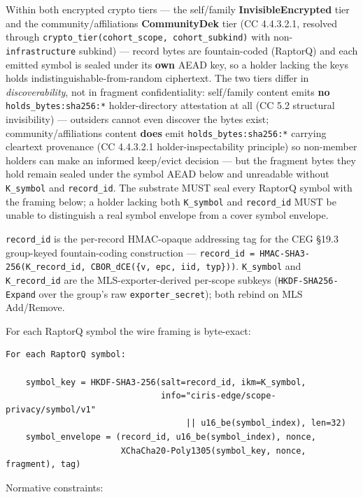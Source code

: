 \documentclass[11pt]{article}
\begin{document}
Within both encrypted crypto tiers — the self/family \textbf{InvisibleEncrypted} tier and the community/affiliations \textbf{CommunityDek} tier (CC 4.4.3.2.1, resolved through \texttt{crypto\_tier(cohort\_scope, cohort\_subkind)} with non-\texttt{infrastructure} subkind) — record bytes are fountain-coded (RaptorQ) and each emitted symbol is sealed under its \textbf{own} AEAD key, so a holder lacking the keys holds indistinguishable-from-random ciphertext. The two tiers differ in \textit{discoverability}, not in fragment confidentiality: self/family content emits \textbf{no} \texttt{holds\_bytes:sha256:*} holder-directory attestation at all (CC 5.2 structural invisibility) — outsiders cannot even discover the bytes exist; community/affiliations content \textbf{does} emit \texttt{holds\_bytes:sha256:*} carrying cleartext provenance (CC 4.4.3.2.1 holder-inspectability principle) so non-member holders can make an informed keep/evict decision — but the fragment bytes they hold remain sealed under the symbol AEAD below and unreadable without \texttt{K\_symbol} and \texttt{record\_id}. The substrate MUST seal every RaptorQ symbol with the framing below; a holder lacking both \texttt{K\_symbol} and \texttt{record\_id} MUST be unable to distinguish a real symbol envelope from a cover symbol envelope.


\texttt{record\_id} is the per-record HMAC-opaque addressing tag for the CEG §19.3 group-keyed fountain-coding construction — \texttt{record\_id = HMAC-SHA3-256(K\_record\_id, CBOR\_dCE(\{v, epc, iid, typ\}))}. \texttt{K\_symbol} and \texttt{K\_record\_id} are the MLS-exporter-derived per-scope subkeys (\texttt{HKDF-SHA256-Expand} over the group's raw \texttt{exporter\_secret}); both rebind on MLS Add/Remove.


For each RaptorQ symbol the wire framing is byte-exact:


\begin{lstlisting}
For each RaptorQ symbol:

    symbol_key = HKDF-SHA3-256(salt=record_id, ikm=K_symbol,
                               info="ciris-edge/scope-privacy/symbol/v1"
                                    || u16_be(symbol_index), len=32)
    symbol_envelope = (record_id, u16_be(symbol_index), nonce,
                       XChaCha20-Poly1305(symbol_key, nonce, fragment), tag)
\end{lstlisting}

Normative constraints:
\end{document}
